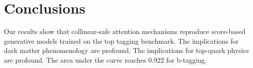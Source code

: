 \section{Conclusions}\label{sec:conclusions}

Our results show that collinear-safe attention mechanisms reproduce
score-based generative models trained on the top tagging benchmark. The
implications for dark matter phenomenology are profound. The
implications for top-quark physics are profound. The area under the
curve reaches 0.922 for b-tagging.

